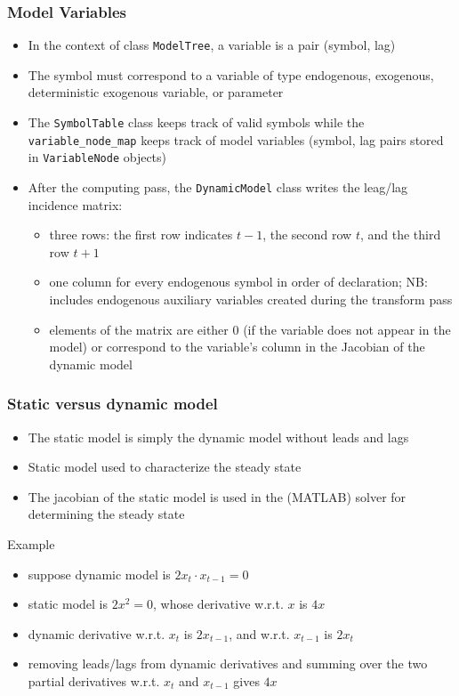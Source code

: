 \documentclass{beamer}
\begin{document}
\begin{frame}
  \frametitle{Model Variables}
  \begin{itemize}
  \item In the context of class \texttt{ModelTree}, a \alert{variable} is a pair (symbol, lag)
  \item The symbol must correspond to a variable of type endogenous, exogenous, deterministic exogenous variable, or parameter
  \item The \texttt{SymbolTable} class keeps track of valid symbols while the \texttt{variable\_node\_map} keeps track of model variables (symbol, lag pairs stored in \texttt{VariableNode} objects)
  \item After the computing pass, the \texttt{DynamicModel} class writes the leag/lag incidence matrix:
    \begin{itemize}
    \item three rows: the first row indicates $t-1$, the second row $t$, and the third row $t+1$
    \item one column for every endogenous symbol in order of declaration; NB: includes endogenous auxiliary variables created during the transform pass
    \item elements of the matrix are either 0 (if the variable does not appear in the model) or correspond to the variable's column in the Jacobian of the dynamic model
    \end{itemize}
  \end{itemize}
\end{frame}

\begin{frame}
  \frametitle{Static versus dynamic model}
  \begin{itemize}
  \item The static model is simply the dynamic model without leads and lags
  \item Static model used to characterize the steady state
  \item The jacobian of the static model is used in the (MATLAB) solver for determining the steady state
  \end{itemize}
  \begin{block}{Example}
    \begin{itemize}
    \item suppose dynamic model is $2x_t \cdot x_{t-1} = 0$
    \item static model is $2x^2 = 0$, whose derivative w.r.t. $x$ is $4x$
    \item dynamic derivative w.r.t. $x_t$ is $2x_{t-1}$, and w.r.t. $x_{t-1}$ is $2x_t$
    \item removing leads/lags from dynamic derivatives and summing over the two partial derivatives w.r.t. $x_t$ and $x_{t-1}$ gives $4x$
    \end{itemize}
  \end{block}
\end{frame}
\end{document}
